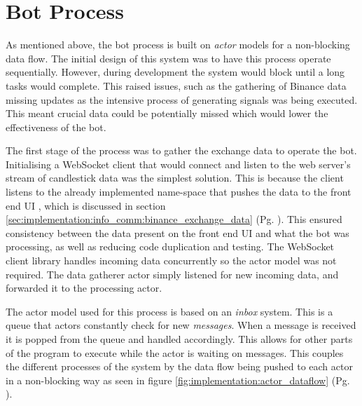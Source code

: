 \section{Bot Process}
\label{sec:implementation:bot}

\noindent As mentioned above, the bot process is built on \textit{actor} models for a non-blocking data flow. The initial design of this system was to have this process operate sequentially. However, during development the system would block until a long tasks would complete. This raised issues, such as the gathering of Binance data missing updates as the intensive process of generating signals was being executed. This meant crucial data could be potentially missed which would lower the effectiveness of the bot.

The first stage of the process was to gather the exchange data to operate the bot. Initialising a WebSocket client that would connect and listen to the web server's stream of candlestick data was the simplest solution. This is because the client listens to the already implemented name-space that pushes the data to the front end UI , which is discussed in section \ref{sec:implementation:info_comm:binance_exchange_data} (Pg. \pageref{sec:implementation:info_comm:binance_exchange_data}). This ensured consistency between the data present on the front end UI and what the bot was processing, as well as reducing code duplication and testing. The WebSocket client library handles incoming data concurrently so the actor model was not required. The data gatherer actor simply listened for new incoming data, and forwarded it to the processing actor.

The actor model used for this process is based on an \textit{inbox} system. This is a queue that actors constantly check for new \textit{messages}. When a message is received it is popped from the queue and handled accordingly. This allows for other parts of the program to execute while the actor is waiting on messages. This couples the different processes of the system by the data flow being pushed to each actor in a non-blocking way as seen in figure \ref{fig:implementation:actor_dataflow} (Pg. \pageref{fig:implementation:actor_dataflow}). 

